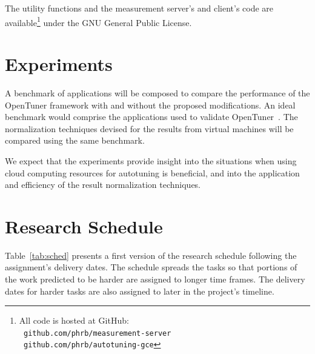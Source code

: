 \documentclass[a4paper, 12pt]{article}
\begin{document}
The utility functions and the measurement server's and client's code are
available\footnote{All code is hosted at GitHub: \\ \texttt{\scriptsize
github.com/phrb/measurement-server} \\ \texttt{\scriptsize
github.com/phrb/autotuning-gce}} under the GNU General Public License.



\section{Experiments} \label{sec:exp}

A benchmark of applications will be composed to compare the performance of the
OpenTuner framework with and without the proposed modifications.  An ideal
benchmark would comprise the applications used to validate
OpenTuner~\cite{ansel2014opentuner}.  The normalization techniques devised for
the results from virtual machines will be compared using the same benchmark.

We expect that the experiments provide insight into the situations when using
cloud computing resources for autotuning is beneficial, and into the
application and efficiency of the result normalization techniques.

\section{Research Schedule} \label{sec:sched}

Table~\ref{tab:sched} presents a first version of the research schedule
following the assignment's delivery dates.  The schedule spreads the tasks so
that portions of the work predicted to be harder are assigned to longer time
frames.  The delivery dates for harder tasks are also assigned to later in the
project's timeline.

\newcommand{\specialcell}[2][c]{%
  \begin{tabular}[#1]{@{}K@{}}#2\end{tabular}}
\end{document}
